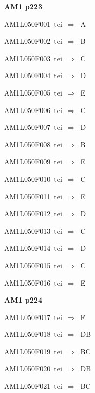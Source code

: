 \par\vfill\eject
{\bf\hfill AM1 p223\hfill\hbox{}}\par\bigskip
{\sixrm AM1L050F001\ {\sixit tei}\ }$\Rightarrow$\ A\par\smallskip
{\sixrm AM1L050F002\ {\sixit tei}\ }$\Rightarrow$\ B\par\smallskip
{\sixrm AM1L050F003\ {\sixit tei}\ }$\Rightarrow$\ C\par\smallskip
{\sixrm AM1L050F004\ {\sixit tei}\ }$\Rightarrow$\ D\par\smallskip
{\sixrm AM1L050F005\ {\sixit tei}\ }$\Rightarrow$\ E\par\smallskip
{\sixrm AM1L050F006\ {\sixit tei}\ }$\Rightarrow$\ C\par\smallskip
{\sixrm AM1L050F007\ {\sixit tei}\ }$\Rightarrow$\ D\par\smallskip
{\sixrm AM1L050F008\ {\sixit tei}\ }$\Rightarrow$\ B\par\smallskip
{\sixrm AM1L050F009\ {\sixit tei}\ }$\Rightarrow$\ E\par\smallskip
{\sixrm AM1L050F010\ {\sixit tei}\ }$\Rightarrow$\ C\par\smallskip
{\sixrm AM1L050F011\ {\sixit tei}\ }$\Rightarrow$\ E\par\smallskip
{\sixrm AM1L050F012\ {\sixit tei}\ }$\Rightarrow$\ D\par\smallskip
{\sixrm AM1L050F013\ {\sixit tei}\ }$\Rightarrow$\ C\par\smallskip
{\sixrm AM1L050F014\ {\sixit tei}\ }$\Rightarrow$\ D\par\smallskip
{\sixrm AM1L050F015\ {\sixit tei}\ }$\Rightarrow$\ C\par\smallskip
{\sixrm AM1L050F016\ {\sixit tei}\ }$\Rightarrow$\ E\par\smallskip

\par\vfill\eject
{\bf\hfill AM1 p224\hfill\hbox{}}\par\bigskip
{\sixrm AM1L050F017\ {\sixit tei}\ }$\Rightarrow$\ F\par\smallskip
{\sixrm AM1L050F018\ {\sixit tei}\ }$\Rightarrow$\ DB\par\smallskip
{\sixrm AM1L050F019\ {\sixit tei}\ }$\Rightarrow$\ BC\par\smallskip
{\sixrm AM1L050F020\ {\sixit tei}\ }$\Rightarrow$\ DB\par\smallskip
{\sixrm AM1L050F021\ {\sixit tei}\ }$\Rightarrow$\ BC\par\smallskip

